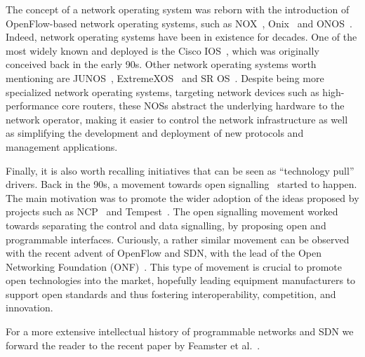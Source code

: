 The concept of a network operating system was reborn with the introduction of OpenFlow-based network 
operating systems, such as NOX~\cite{gude2008}, Onix~\cite{koponen-1} 
and ONOS~\cite{krishnaswamy2013}. Indeed, network operating systems have been in existence for decades.
One of the most widely known and deployed is the Cisco IOS~\cite{bollapragada2000}, which was originally 
conceived back in the early 90s. Other network operating systems worth mentioning are JUNOS~\cite{junipernetworks2012},
ExtremeXOS~\cite{extremenetworks2014} and SR OS~\cite{alcatellucent2014}. Despite being more specialized 
network operating systems, targeting network devices such as high-performance core routers, these NOSs abstract 
the underlying hardware to the network operator, making it easier to control the network infrastructure as well 
as simplifying the development and deployment of new protocols and management applications.

Finally, it is also worth recalling initiatives that can be seen as ``technology pull'' drivers.
Back in the 90s, a movement towards open signalling~\cite{campbell1999} started 
to happen. The main motivation was to promote the wider adoption of the ideas proposed by projects 
such as NCP~\cite{sheinbein1982} and Tempest~\cite{merwe1998}. The open signalling movement worked 
towards separating the control and data signalling, by proposing open and programmable interfaces.
Curiously, a rather similar movement can be observed with the recent advent of OpenFlow and SDN, with 
the lead of the Open Networking Foundation (ONF)~\cite{onf2013-3}. This type of movement is crucial 
to promote open technologies into the market, hopefully leading equipment manufacturers to support 
open standards and thus fostering interoperability, competition, and innovation.

For a more extensive intellectual history of programmable networks and SDN we forward the reader to 
the recent paper by Feamster et al.~\cite{feamster2013-2}.

